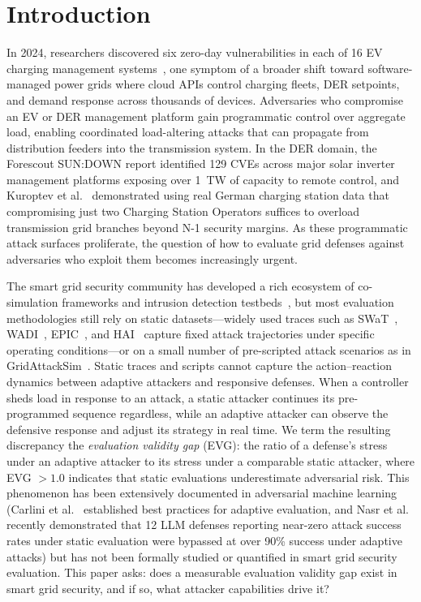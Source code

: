 \section{Introduction}
\label{sec:introduction}

In 2024, researchers discovered six zero-day vulnerabilities in each of 16 EV charging management systems~\cite{sarieddine2024ocpp}, one symptom of a broader shift toward software-managed power grids where cloud APIs control charging fleets, DER setpoints, and demand response across thousands of devices.
Adversaries who compromise an EV or DER management platform gain programmatic control over aggregate load, enabling coordinated load-altering attacks that can propagate from distribution feeders into the transmission system.
In the DER domain, the Forescout SUN:DOWN report identified 129 CVEs across major solar inverter management platforms exposing over 1~TW of capacity to remote control, and Kuroptev et al.~\cite{kuroptev2026evgrid} demonstrated using real German charging station data that compromising just two Charging Station Operators suffices to overload transmission grid branches beyond N-1 security margins.
As these programmatic attack surfaces proliferate, the question of how to evaluate grid defenses against adversaries who exploit them becomes increasingly urgent.

The smart grid security community has developed a rich ecosystem of co-simulation frameworks and intrusion detection testbeds~\cite{cintuglu2017testbeds, smadi2021testbeds}, but most evaluation methodologies still rely on static datasets---widely used traces such as SWaT~\cite{goh2017swat}, WADI~\cite{ahmed2017wadi}, EPIC~\cite{adepu2019epic}, and HAI~\cite{shin2020hai} capture fixed attack trajectories under specific operating conditions---or on a small number of pre-scripted attack scenarios as in GridAttackSim~\cite{le2020gridattacksim}.
Static traces and scripts cannot capture the action--reaction dynamics between adaptive attackers and responsive defenses. When a controller sheds load in response to an attack, a static attacker continues its pre-programmed sequence regardless, while an adaptive attacker can observe the defensive response and adjust its strategy in real time.
We term the resulting discrepancy the \emph{evaluation validity gap} (EVG): the ratio of a defense's stress under an adaptive attacker to its stress under a comparable static attacker, where EVG $> 1.0$ indicates that static evaluations underestimate adversarial risk.
This phenomenon has been extensively documented in adversarial machine learning (Carlini et al.~\cite{carlini2019evaluating} established best practices for adaptive evaluation, and Nasr et al.~\cite{nasr2025attacker} recently demonstrated that 12 LLM defenses reporting near-zero attack success rates under static evaluation were bypassed at over 90\% success under adaptive attacks) but has not been formally studied or quantified in smart grid security evaluation.
This paper asks: does a measurable evaluation validity gap exist in smart grid security, and if so, what attacker capabilities drive it?

